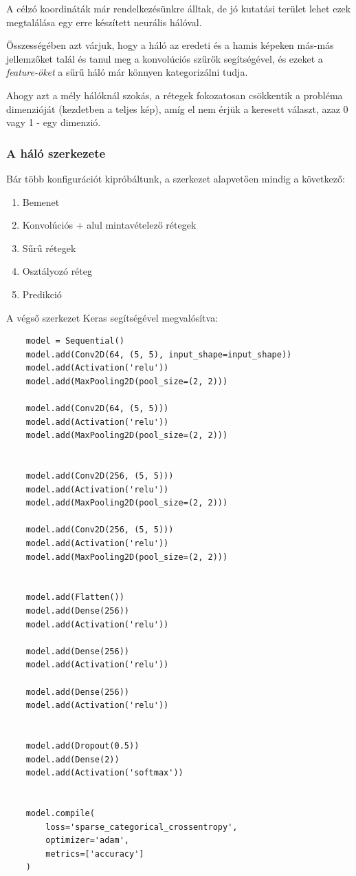 A célzó koordináták már rendelkezésünkre álltak, de jó kutatási terület lehet ezek 
megtalálása egy erre készített neurális hálóval.


Összességében azt várjuk, hogy a háló az eredeti és a hamis képeken más-más 
jellemzőket talál és tanul meg a konvolúciós szűrők segítségével, és ezeket
a \textit{feature-öket} a sűrű háló már könnyen kategorizálni tudja.

Ahogy azt a mély hálóknál szokás, a rétegek fokozatosan csökkentik a probléma
dimenzióját (kezdetben a teljes kép), amíg el nem érjük a keresett választ, azaz 0 vagy 1 - 
egy dimenzió.

\subsubsection{A háló szerkezete}

Bár több konfigurációt kipróbáltunk, a szerkezet alapvetően mindig a következő:



\begin{enumerate} [itemsep=-1ex]
	\item Bemenet
	\item Konvolúciós + alul mintavételező rétegek
	\item Sűrű rétegek
	\item Osztályozó réteg
	\item Predikció
\end{enumerate}

A végső szerkezet Keras segítségével megvalósítva:


\lstset{language=Python}
\begin{lstlisting}  
	model = Sequential()
	model.add(Conv2D(64, (5, 5), input_shape=input_shape))
	model.add(Activation('relu'))
	model.add(MaxPooling2D(pool_size=(2, 2)))
	
	model.add(Conv2D(64, (5, 5)))
	model.add(Activation('relu'))
	model.add(MaxPooling2D(pool_size=(2, 2)))
	
	
	model.add(Conv2D(256, (5, 5)))
	model.add(Activation('relu'))
	model.add(MaxPooling2D(pool_size=(2, 2)))
	
	model.add(Conv2D(256, (5, 5)))
	model.add(Activation('relu'))
	model.add(MaxPooling2D(pool_size=(2, 2)))
	
	
	model.add(Flatten())
	model.add(Dense(256))
	model.add(Activation('relu'))
	
	model.add(Dense(256))
	model.add(Activation('relu'))
	
	model.add(Dense(256))
	model.add(Activation('relu'))
	
	
	model.add(Dropout(0.5))
	model.add(Dense(2))
	model.add(Activation('softmax'))
	
	
	model.compile(
		loss='sparse_categorical_crossentropy',
		optimizer='adam',
		metrics=['accuracy']
	) 

\end{lstlisting}


